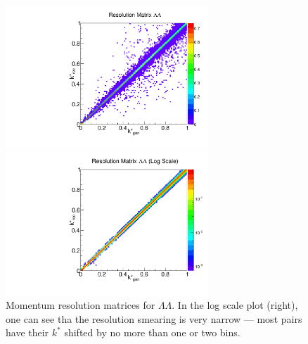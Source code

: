 \begin{figure}[h]
\begin{minipage}{18pc}
\includegraphics[width=18pc]{Figures/2016-07-19-ResMatrixLambdaLambda.pdf}
\end{minipage}\hspace{2pc}
\begin{minipage}{18pc}
\includegraphics[width=18pc]{Figures/2016-07-19-ResMatrixLambdaLambdaLog.pdf}
\end{minipage} 
\caption[Momentum resolution matrices -- $\Lambda\Lambda$]{\label{fig:MomResLL} Momentum resolution matrices for $\Lambda\Lambda$. In the log scale plot (right), one can see tha the resolution smearing is very narrow --- most pairs have their $k^*$ shifted by no more than one or two bins.}
\end{figure}

